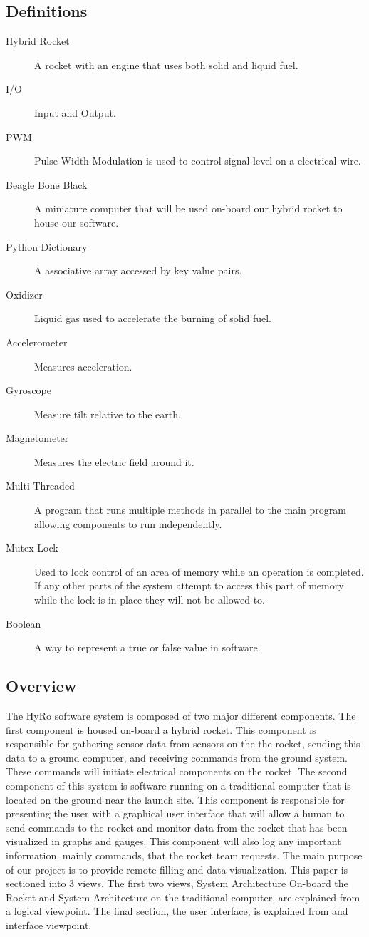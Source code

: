 \documentclass[10pt,draftclsnofoot,onecolumn,compsoc]{IEEEtran}
\begin{document}
\subsection{Definitions}
\begin{description}
	\item[Hybrid Rocket] A rocket with an engine that uses both solid and liquid fuel.
	\item[I/O] Input and Output.
	\item[PWM] Pulse Width Modulation is used to control signal level on a electrical wire.
	\item[Beagle Bone Black] A miniature computer that will be used on-board our hybrid rocket to house our software.
	\item[Python Dictionary] A associative array accessed by key value pairs.
	\item[Oxidizer] Liquid gas used to accelerate the burning of solid fuel.
	\item[Accelerometer] Measures acceleration.
	\item[Gyroscope] Measure tilt relative to the earth.
	\item[Magnetometer] Measures the electric field around it.
	\item[Multi Threaded] A program that runs multiple methods in parallel to the main program allowing components to run independently.
	\item[Mutex Lock] Used to lock control of an area of memory while an operation is completed. If any other parts of the system attempt to access this part of memory while the lock is in place they will not be allowed to.
	\item[Boolean] A way to represent a true or false value in software.
\end{description}
\subsection{Overview}
The HyRo software system is composed of two major different components. The first component is housed on-board a hybrid rocket. This component is responsible for gathering sensor data from sensors on the the rocket, sending this data to a ground computer, and receiving commands from the ground system. These commands will initiate electrical components on the rocket. The second component of this system is software running on a traditional computer that is located on the ground near the launch site. This component is responsible for presenting the user with a graphical user interface that will allow a human to send commands to the rocket and monitor data from the rocket that has been visualized in graphs and gauges. This component will also log any important information, mainly commands, that the rocket team requests. The main purpose of our project is to provide remote filling and data visualization. This paper is sectioned into 3 views. The first two views, System Architecture On-board the Rocket and System Architecture on the traditional computer, are explained from a logical viewpoint. The final section, the user interface, is explained from and interface viewpoint.
\end{document}
